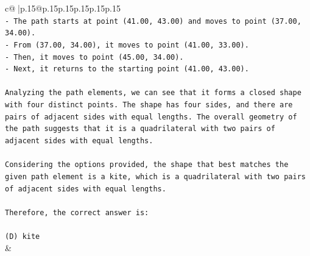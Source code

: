 \documentclass{article}
\begin{document}
{\begin{supertabular}{c@{$\;$}|p{.15\linewidth}@{}p{.15\linewidth}p{.15\linewidth}p{.15\linewidth}p{.15\linewidth}p{.15\linewidth}}
{{{\\ 
\texttt{{-} The path starts at point (41.00, 43.00) and moves to point (37.00, 34.00).} \\
\texttt{{-} From (37.00, 34.00), it moves to point (41.00, 33.00).} \\
\texttt{{-} Then, it moves to point (45.00, 34.00).} \\
\texttt{{-} Next, it returns to the starting point (41.00, 43.00).} \\
\\ 
\texttt{Analyzing the path elements, we can see that it forms a closed shape with four distinct points. The shape has four sides, and there are pairs of adjacent sides with equal lengths. The overall geometry of the path suggests that it is a quadrilateral with two pairs of adjacent sides with equal lengths.} \\
\\ 
\texttt{Considering the options provided, the shape that best matches the given path element is a kite, which is a quadrilateral with two pairs of adjacent sides with equal lengths.} \\
\\ 
\texttt{Therefore, the correct answer is:} \\
\\ 
\texttt{(D) kite} \\
            }
        }
    }
    & \\ \\

\end{supertabular}
}
\end{document}
